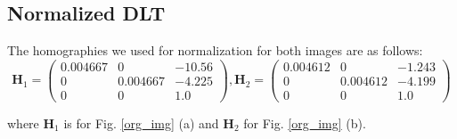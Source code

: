 \documentclass[conference]{IEEEtran}
\newcommand{\mat}[1]{\mathbf{#1}} %
\begin{document}
\subsection{Normalized DLT}
The homographies we used for normalization for both images are as follows: 
\begin{equation}
	\mat{H}_1 = 
	\begin{pmatrix}
		0.004667 & 0 & -10.56\\ 0 & 0.004667 & -4.225\\ 0 & 0 & 1.0
	\end{pmatrix}, 
	\mat{H}_2 = 
	\begin{pmatrix}
		0.004612 & 0 & -1.243\\ 0 & 0.004612 & -4.199\\ 0 & 0 & 1.0
	\end{pmatrix}
\end{equation}

where $\mat{H}_1$ is for Fig. \ref{org_img} (a) and $\mat{H}_2$ for Fig. \ref{org_img} (b).
\end{document}
